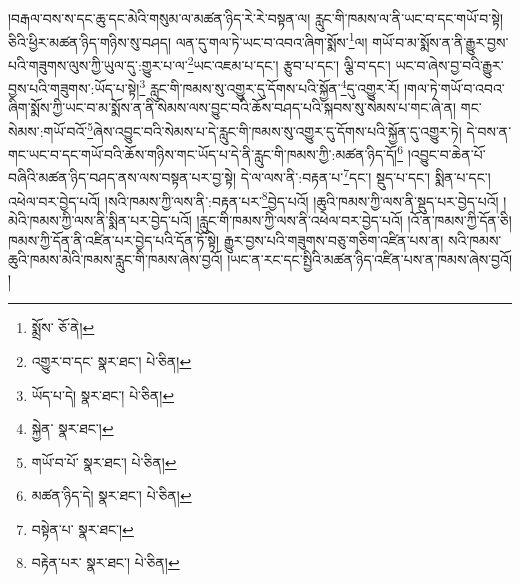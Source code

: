 །བརྒལ་བས་ས་དང་ཆུ་དང་མེའི་གསུམ་ལ་མཚན་ཉིད་རེ་རེ་བསྟན་ལ། རླུང་གི་ཁམས་ལ་ནི་ཡང་བ་དང་གཡོ་བ་སྟེ། ཅིའི་ཕྱིར་མཚན་ཉིད་གཉིས་སུ་བཤད། ལན་དུ་གལ་ཏེ་ཡང་བ་འབའ་ཞིག་སྨོས་\footnote{སྨྲོས་  ཅོ་ནེ། }ལ། གཡོ་བ་མ་སྨོས་ན་ནི་རྒྱུར་བྱས་པའི་གཟུགས་ལུས་ཀྱི་ཡུལ་དུ་:གྱུར་པ་ལ་\footnote{འགྱུར་བ་དང་  སྣར་ཐང་།  པེ་ཅིན། }ཡང་འཇམ་པ་དང་། རྩུབ་པ་དང་། ལྕི་བ་དང་། ཡང་བ་ཞེས་བྱ་བའི་རྒྱུར་བྱས་པའི་གཟུགས་:ཡོད་པ་སྟེ།\footnote{ཡོད་པ་དེ།  སྣར་ཐང་།  པེ་ཅིན། } རླུང་གི་ཁམས་སུ་འགྱུར་དུ་དོགས་པའི་སྐྱོན་\footnote{སྐྱེན་  སྣར་ཐང་། }དུ་འགྱུར་རོ། །གལ་ཏེ་གཡོ་བ་འབའ་ཞིག་སྨོས་ཀྱི་ཡང་བ་མ་སྨོས་ན་ནི་སེམས་ལས་བྱུང་བའི་ཆོས་བཤད་པའི་སྐབས་སུ་སེམས་པ་གང་ཞེ་ན། གང་སེམས་:གཡོ་བའོ་\footnote{གཡོ་བ་པོ་  སྣར་ཐང་།  པེ་ཅིན། }ཞེས་འབྱུང་བའི་སེམས་པ་དེ་རླུང་གི་ཁམས་སུ་འགྱུར་དུ་དོགས་པའི་སྐྱོན་དུ་འགྱུར་ཏེ། དེ་བས་ན་གང་ཡང་བ་དང་གཡོ་བའི་ཆོས་གཉིས་གང་ཡོད་པ་དེ་ནི་རླུང་གི་ཁམས་ཀྱི་:མཚན་ཉིད་དོ།\footnote{མཚན་ཉིད་དེ།  སྣར་ཐང་།  པེ་ཅིན། } །འབྱུང་བ་ཆེན་པོ་བཞིའི་མཚན་ཉིད་བཤད་ནས་ལས་བསྟན་པར་བྱ་སྟེ། དེ་ལ་ལས་ནི་:བརྟན་པ་\footnote{བསྟེན་པ་  སྣར་ཐང་། }དང་། སྡུད་པ་དང་། སྨིན་པ་དང་། འཕེལ་བར་བྱེད་པའོ། །སའི་ཁམས་ཀྱི་ལས་ནི་:བརྟན་པར་\footnote{བརྟེན་པར་  སྣར་ཐང་།  པེ་ཅིན། }བྱེད་པའོ། །ཆུའི་ཁམས་ཀྱི་ལས་ནི་སྡུད་པར་བྱེད་པའོ། །མེའི་ཁམས་ཀྱི་ལས་ནི་སྨིན་པར་བྱེད་པའོ། །རླུང་གི་ཁམས་ཀྱི་ལས་ནི་འཕེལ་བར་བྱེད་པའོ། །འོ་ན་ཁམས་ཀྱི་དོན་ཅི། ཁམས་ཀྱི་དོན་ནི་འཛིན་པར་བྱེད་པའི་དོན་ཏོ་སྟེ། རྒྱུར་བྱས་པའི་གཟུགས་བཅུ་གཅིག་འཛིན་པས་ན། སའི་ཁམས་ཆུའི་ཁམས་མེའི་ཁམས་རླུང་གི་ཁམས་ཞེས་བྱའོ། །ཡང་ན་རང་དང་སྤྱིའི་མཚན་ཉིད་འཛིན་པས་ན་ཁམས་ཞེས་བྱའོ། །
